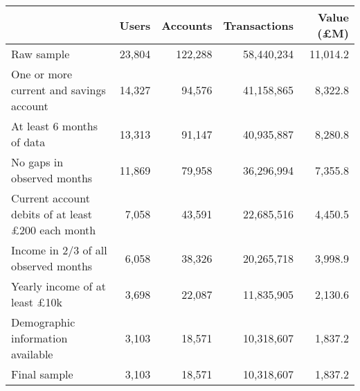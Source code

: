 \begin{tabular}{lrrrr}
\toprule
                                                         &  Users & Accounts & Transactions & Value (\pounds M) \\
\midrule
                                              Raw sample & 23,804 &  122,288 &   58,440,234 &          11,014.2 \\
                 One or more current and savings account & 14,327 &   94,576 &   41,158,865 &           8,322.8 \\
                               At least 6 months of data & 13,313 &   91,147 &   40,935,887 &           8,280.8 \\
                              No gaps in observed months & 11,869 &   79,958 &   36,296,994 &           7,355.8 \\
Current account debits of at least \pounds200 each month &  7,058 &   43,591 &   22,685,516 &           4,450.5 \\
                    Income in 2/3 of all observed months &  6,058 &   38,326 &   20,265,718 &           3,998.9 \\
                    Yearly income of at least \pounds10k &  3,698 &   22,087 &   11,835,905 &           2,130.6 \\
                       Demographic information available &  3,103 &   18,571 &   10,318,607 &           1,837.2 \\
                                            Final sample &  3,103 &   18,571 &   10,318,607 &           1,837.2 \\
\bottomrule
\end{tabular}
